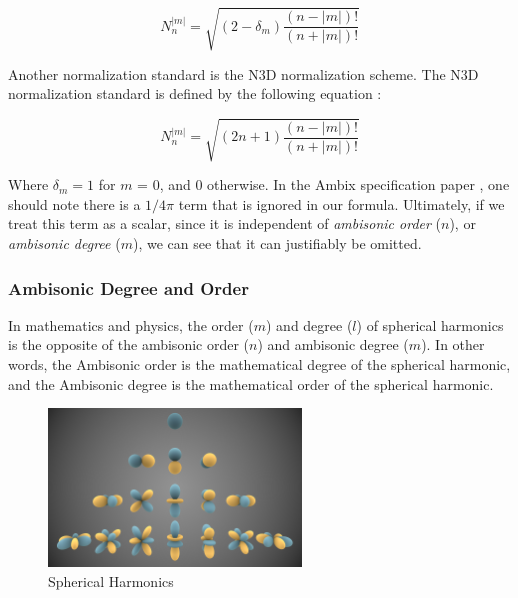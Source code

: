 \begin{equation}
N_{n}^{|m|}=\sqrt{\left(2-\delta_{m}\right) \frac{(n-|m|) !}{(n+|m|) !}}
\end{equation}

Another normalization standard is the N3D normalization scheme. The N3D normalization standard is defined by the following equation \cite{politis2016jsambisonics}:

\begin{equation}
N_{n}^{|m|}= \sqrt{(2 n+1) \frac{(n-|m|) !}{(n+|m|) !}}
\end{equation}

Where $\delta_m = 1$ for $m$ = 0, and 0 otherwise. In the Ambix specification paper \cite{nachbar2011ambix}, one should note there is a $1/4\pi$ term that is ignored in our formula. Ultimately, if we treat this term as a scalar, since it is independent of \textit{ambisonic order} ($n$), or \textit{ambisonic degree} ($m$), we can see that it can justifiably be omitted.

\subsubsection{Ambisonic Degree and Order}

In mathematics and physics, the order ($m$) and degree ($l$) of spherical harmonics is the opposite of the ambisonic order ($n$) and ambisonic degree ($m$). In other words, the Ambisonic order is the mathematical degree of the spherical harmonic, and the Ambisonic degree is the mathematical order of the spherical harmonic. 


\begin{figure}[ht!]%
\centering
\includegraphics[width=0.6\textwidth]{img/sph-harm.png}
\caption{Spherical Harmonics \cite{Spherica39online}}
\label{fig:sph-harm}
\end{figure}

